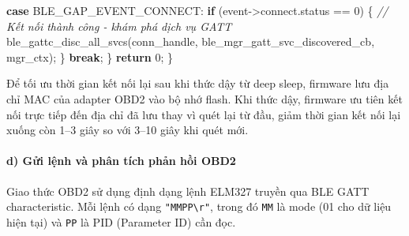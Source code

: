 \documentclass[a4paper]{extarticle}
\newenvironment{Shaded}{}{}
\newcommand{\CommentTok}[1]{\textcolor[rgb]{0.38,0.63,0.69}{\textit{#1}}}
\newcommand{\ControlFlowTok}[1]{\textcolor[rgb]{0.00,0.44,0.13}{\textbf{#1}}}
\newcommand{\DecValTok}[1]{\textcolor[rgb]{0.25,0.63,0.44}{#1}}
\newcommand{\NormalTok}[1]{#1}
\newcommand{\OperatorTok}[1]{\textcolor[rgb]{0.40,0.40,0.40}{#1}}
\begin{document}
\begin{Shaded}
\begin{Highlighting}[]
    \ControlFlowTok{case}\NormalTok{ BLE\_GAP\_EVENT\_CONNECT}\OperatorTok{:}
        \ControlFlowTok{if} \OperatorTok{(}\NormalTok{event}\OperatorTok{{-}\textgreater{}}\NormalTok{connect}\OperatorTok{.}\NormalTok{status }\OperatorTok{==} \DecValTok{0}\OperatorTok{)} \OperatorTok{\{}
            \CommentTok{// Kết nối thành công {-} khám phá dịch vụ GATT}
\NormalTok{            ble\_gattc\_disc\_all\_svcs}\OperatorTok{(}\NormalTok{conn\_handle}\OperatorTok{,}
\NormalTok{                                     ble\_mgr\_gatt\_svc\_discovered\_cb}\OperatorTok{,}
\NormalTok{                                     mgr\_ctx}\OperatorTok{);}
        \OperatorTok{\}}
        \ControlFlowTok{break}\OperatorTok{;}
    \OperatorTok{\}}
    \ControlFlowTok{return} \DecValTok{0}\OperatorTok{;}
\OperatorTok{\}}
\end{Highlighting}
\end{Shaded}

Để tối ưu thời gian kết nối lại sau khi thức dậy từ deep sleep, firmware
lưu địa chỉ MAC của adapter OBD2 vào bộ nhớ flash. Khi thức dậy,
firmware ưu tiên kết nối trực tiếp đến địa chỉ đã lưu thay vì quét lại
từ đầu, giảm thời gian kết nối lại xuống còn 1--3 giây so với 3--10 giây
khi quét mới.

\paragraph{d) Gửi lệnh và phân tích phản hồi
OBD2}\label{d-gux1eedi-lux1ec7nh-vuxe0-phuxe2n-tuxedch-phux1ea3n-hux1ed3i-obd2}

Giao thức OBD2 sử dụng định dạng lệnh ELM327 truyền qua BLE GATT
characteristic. Mỗi lệnh có dạng \texttt{"MMPP\textbackslash{}r"}, trong
đó \texttt{MM} là mode (01 cho dữ liệu hiện tại) và \texttt{PP} là PID
(Parameter ID) cần đọc.
\end{document}
